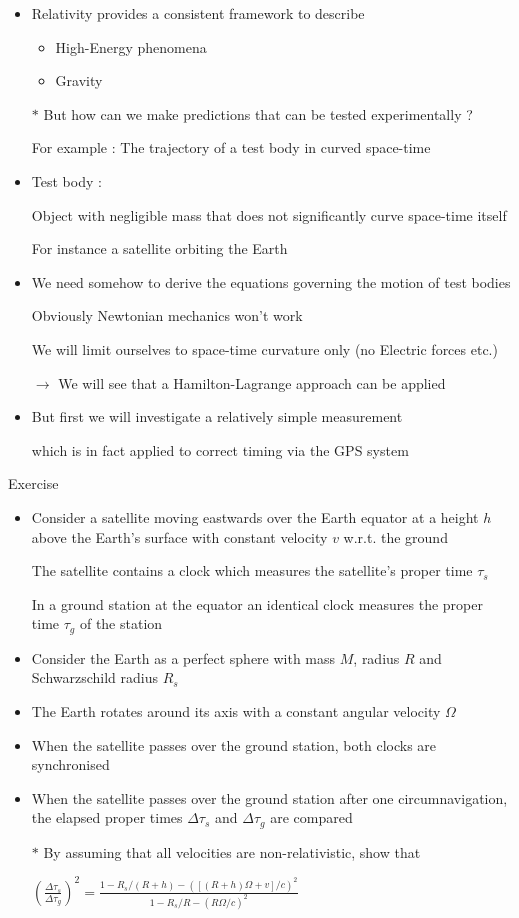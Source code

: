 \begin{itemize}
\item Relativity provides a consistent framework to describe
\begin{itemize}
\item High-Energy phenomena
\item Gravity
\end{itemize}
\item[$\ast$] {\blue But how can we make predictions that can be tested experimentally ?}
\item[] For example : The trajectory of a test body in curved space-time
\item Test body :
\item[] Object with negligible mass that does not significantly curve space-time itself
\item[] For instance a satellite orbiting the Earth
\item We need somehow to derive the equations governing the motion of test bodies
\item[] Obviously Newtonian mechanics won't work
\item[] We will limit ourselves to space-time curvature only (no Electric forces etc.)
\item[] $\rightarrow$ We will see that a Hamilton-Lagrange approach can be applied
\item But first we will investigate a relatively simple measurement
\item[] which is in fact applied to correct timing via the GPS system
\end{itemize}

\Tr
{\red
\begin{center}
Exercise
\end{center}
%
\begin{itemize}
\item Consider a satellite moving eastwards over the Earth equator
      at a height $h$ above the Earth's surface with constant velocity $v$ w.r.t. the ground
\item[] The satellite contains a clock which measures the satellite's proper time $\tau_{s}$
\item[] In a ground station at the equator an identical clock measures the proper time $\tau_{g}$ of the station
\item Consider the Earth as a perfect sphere with mass $M$, radius $R$ and Schwarzschild radius $R_{s}$
\item The Earth rotates around its axis with a constant angular velocity $\Omega$
\item When the satellite passes over the ground station, both clocks are synchronised
\item When the satellite passes over the ground station after one circumnavigation,
      the elapsed proper times $\Delta \tau_{s}$ and $\Delta \tau_{g}$ are compared
\item[$\ast$] By assuming that all velocities are non-relativistic, show that
\item[] $\displaystyle \left(\frac{\Delta \tau_{s}}{\Delta \tau_{g}}\right)^{2}=
         \frac{1-R_{s}/(R+h)-([(R+h)\Omega+v]/c)^{2}}{1-R_{s}/R-(R\Omega/c)^{2}}$
\end{itemize}
}